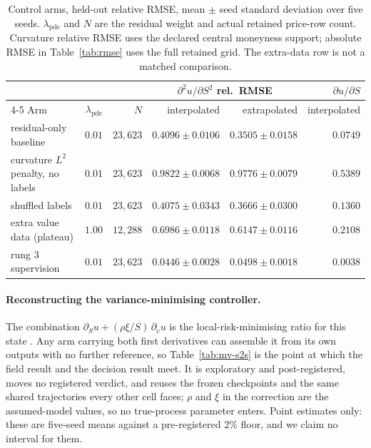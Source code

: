 \documentclass{article}
\begin{document}
\begin{table}[!htbp]
\caption{Control arms, held-out relative RMSE, mean $\pm$ seed standard deviation
over five seeds. $\lambda_{\mathrm{pde}}$ and $N$ are the residual weight and
actual retained price-row count. Curvature relative RMSE uses the declared central
moneyness support; absolute RMSE in Table~\ref{tab:rmse} uses the full retained grid.
The extra-data row is not a matched comparison.}
\label{tab:controls}
\centering\footnotesize\setlength{\tabcolsep}{4pt}
\begin{tabular}{@{}lrrrrr@{}}
\toprule
& & & \multicolumn{2}{c}{$\partial^{2}u/\partial S^{2}$ rel.\ RMSE} & $\partial u/\partial S$ \\
\cmidrule(lr){4-5}
Arm & $\lambda_{\mathrm{pde}}$ & $N$ & interpolated & extrapolated & interpolated \\
\midrule
residual-only baseline & $0.01$ & $23{,}623$ & $0.4096 \pm 0.0106$ & $0.3505 \pm 0.0158$ & $0.0749$ \\
curvature $L^{2}$ penalty, no labels & $0.01$ & $23{,}623$ & $0.9822 \pm 0.0068$ & $0.9776 \pm 0.0079$ & $0.5389$ \\
shuffled labels & $0.01$ & $23{,}623$ & $0.4075 \pm 0.0343$ & $0.3666 \pm 0.0300$ & $0.1360$ \\
extra value data (plateau) & $1.00$ & $12{,}288$ & $0.6986 \pm 0.0118$ & $0.6147 \pm 0.0116$ & $0.2108$ \\
rung 3 supervision & $0.01$ & $23{,}623$ & $\mathbf{0.0446 \pm 0.0028}$ & $\mathbf{0.0498 \pm 0.0018}$ & $\mathbf{0.0038}$ \\
\bottomrule
\end{tabular}
\end{table}

\paragraph{Reconstructing the variance-minimising controller.} The combination
$\partial_S u + (\rho\xi/S)\,\partial_v u$ is the local-risk-minimising ratio for
this state \citep{follmer1991hedging}. Any arm carrying both first derivatives can
assemble it from its own outputs with no further reference, so Table~\ref{tab:mv-s2s}
is the point at which the field result and the decision result meet. It is
exploratory and post-registered, moves no registered verdict, and reuses the frozen
checkpoints and the same shared trajectories every other cell faces; $\rho$ and $\xi$
in the correction are the assumed-model values, so no true-process parameter enters.
Point estimates only: these are five-seed means against a pre-registered $2\%$ floor,
and we claim no interval for them.
\end{document}
